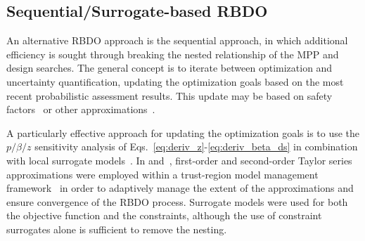 \subsection{Sequential/Surrogate-based RBDO} \label{ouu:rbdo:surr}

An alternative RBDO approach is the sequential approach, in which
additional efficiency is sought through breaking the nested
relationship of the MPP and design searches.  The general concept is
to iterate between optimization and uncertainty quantification,
updating the optimization goals based on the most recent probabilistic
assessment results.  This update may be based on safety
factors~\cite{Wu01} or other approximations~\cite{Du04}.

A particularly effective approach for updating the optimization goals
is to use the $p/\beta/z$ sensitivity analysis of
Eqs.~\ref{eq:deriv_z}-\ref{eq:deriv_beta_ds} in combination with local
surrogate models~\cite{Zou04}.  In \cite{Eld05} and~\cite{Eld06a},
first-order and second-order Taylor series approximations were
employed within a trust-region model management framework~\cite{Giu00}
in order to adaptively manage the extent of the approximations and
ensure convergence of the RBDO process.  Surrogate models were used
for both the objective function and the constraints, although the use
of constraint surrogates alone is sufficient to remove the nesting.


